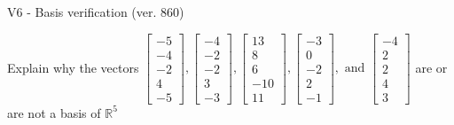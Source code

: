 \begin{exercise}
  \begin{exerciseTitle}V6 - Basis verification (ver. 860)\end{exerciseTitle}
  \begin{exerciseStatement}
    Explain why the vectors \(\left[\begin{array}{r}
-5 \\
-4 \\
-2 \\
4 \\
-5
\end{array}\right] , \left[\begin{array}{r}
-4 \\
-2 \\
-2 \\
3 \\
-3
\end{array}\right] , \left[\begin{array}{r}
13 \\
8 \\
6 \\
-10 \\
11
\end{array}\right] , \left[\begin{array}{r}
-3 \\
0 \\
-2 \\
2 \\
-1
\end{array}\right] , \text{ and } \left[\begin{array}{r}
-4 \\
2 \\
2 \\
4 \\
3
\end{array}\right]\) are or are not a basis of \(\mathbb{R}^5\)	



\end{exerciseStatement}
\end{exercise}
